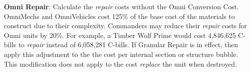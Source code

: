 \item {\bfseries Omni Repair}: Calculate the \emph{repair} costs without the Omni Conversion Cost.
OmniMechs and OmniVehicles cost 125\% of the base cost of the materials to construct due to their complexity.
Commanders may reduce their \emph{repair} costs for Omni units by 20\%.
For example, a Timber Wolf Prime would cost 4,846,625 C-bills to \emph{repair} instead of 6,058,281 C-bills.
If Granular Repair is in effect, then apply this adjustment to the the cost per internal section or structure bubble.
This modification does not apply to the cost \emph{replace} the unit when destroyed.
